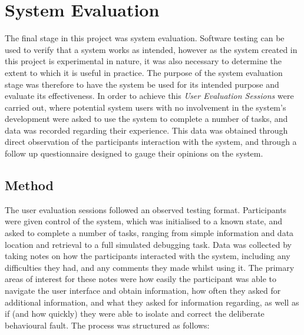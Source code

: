 
\chapter[System Evaluation]{System Evaluation} %

\label{ChapterEvaluation} %

The final stage in this project was system evaluation. Software testing can be used to verify that a system works as intended, however as the system created in this project is experimental in nature, it was also necessary to determine the extent to which it is useful in practice. The purpose of the system evaluation stage was therefore to have the system be used for its intended purpose and evaluate its effectiveness. In order to achieve this \textit{User Evaluation Sessions} were carried out, where potential system users with no involvement in the system's development were asked to use the system to complete a number of tasks, and data was recorded regarding their experience. This data was obtained through direct observation of the participants interaction with the system, and through a follow up questionnaire designed to gauge their opinions on the system.


\section{Method}

The user evaluation sessions followed an observed testing format. Participants were given control of the system, which was initialised to a known state, and asked to complete a number of tasks, ranging from simple information and data location and retrieval to a full simulated debugging task. Data was collected by taking notes on how the participants interacted with the system, including any difficulties they had, and any comments they made whilst using it. The primary areas of interest for these notes were how easily the participant was able to navigate the user interface and obtain information, how often they asked for additional information, and what they asked for information regarding, as well as if (and how quickly) they were able to isolate and correct the deliberate behavioural fault. The process was structured as follows:

